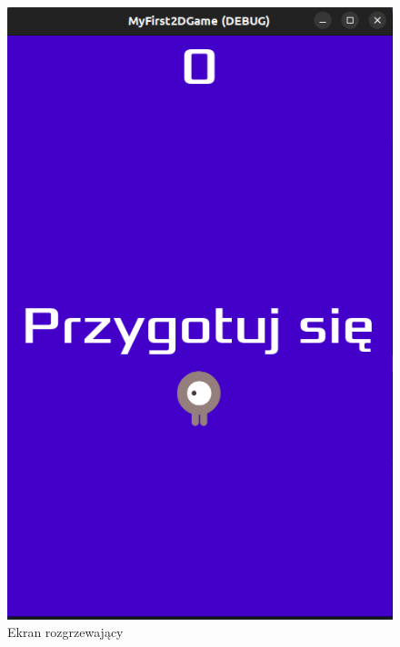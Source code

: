\documentclass[a4paper]{article}
\begin{document}
\begin{center}
	\begin{figure}
		\centering
		\includegraphics[height=0.35\textheight]{get_ready.png}
		\caption{Ekran rozgrzewający}
	\end{figure}
	\begin{figure}
		\centering

\end{figure}
\end{center}
\end{document}
